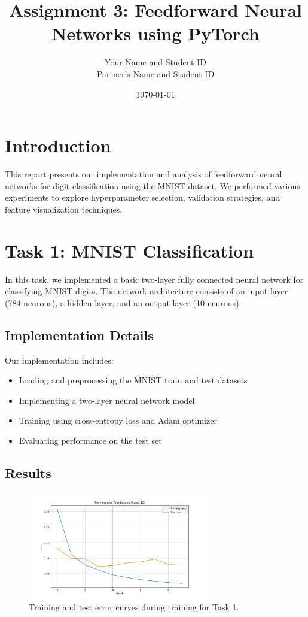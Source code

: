 \documentclass[12pt]{article}
\title{Assignment 3: Feedforward Neural Networks using PyTorch}
\author{Your Name and Student ID \\ Partner's Name and Student ID}
\date{\today}
\begin{document}
\maketitle

\section{Introduction}

This report presents our implementation and analysis of feedforward neural networks for digit classification using the MNIST dataset. We performed various experiments to explore hyperparameter selection, validation strategies, and feature visualization techniques.

\section{Task 1: MNIST Classification}

In this task, we implemented a basic two-layer fully connected neural network for classifying MNIST digits. The network architecture consists of an input layer (784 neurons), a hidden layer, and an output layer (10 neurons).

\subsection{Implementation Details}
Our implementation includes:
\begin{itemize}
    \item Loading and preprocessing the MNIST train and test datasets
    \item Implementing a two-layer neural network model
    \item Training using cross-entropy loss and Adam optimizer 
    \item Evaluating performance on the test set
\end{itemize}

\subsection{Results}

\begin{figure}[H]
    \centering
    \includegraphics[width=0.7\textwidth]{loss_curves.png}
    \caption{Training and test error curves during training for Task 1.}
    \label{fig:task1_curves}
\end{figure}
\end{document}
